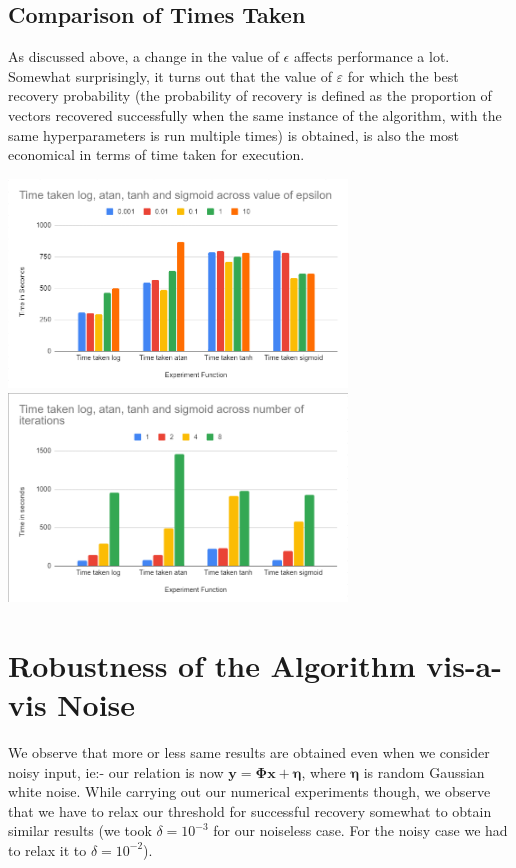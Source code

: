 \documentclass[a4paper,14pt]{article}
\numberwithin{definition}{section}
\numberwithin{mytheorem}{subsection}
\begin{document}
\subsection{Comparison of Times Taken}
As discussed above, a change in the value of $\epsilon$ affects performance a lot. Somewhat surprisingly, it turns out that the value of $\varepsilon$ for which the best recovery probability (the probability of recovery is defined as the proportion of vectors recovered successfully when the same instance of the algorithm, with the same hyperparameters is run multiple times) is obtained, is also the most economical in terms of time taken for execution.

\begin{center}
    \includegraphics[width=9cm]{time_epsilon.png}
    \includegraphics[width=9cm]{time_iterations.png}
\end{center}


\section{Robustness of the Algorithm vis-a-vis Noise}
We observe that more or less same results are obtained even when we consider noisy input, ie:- our relation is now $\boldsymbol{y = \Phi x + \eta}$, where $\boldsymbol{\eta}$ is random Gaussian white noise. While carrying out our numerical experiments though, we observe that we have to relax our threshold for successful recovery somewhat to obtain similar results (we took $\delta = 10^{-3}$ for our noiseless case. For the noisy case we had to relax it to $\delta = 10^{-2}$).
\end{document}
